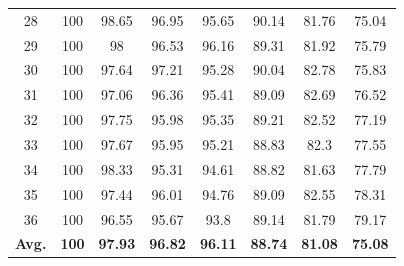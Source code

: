 \documentclass[review]{elsarticle}
\begin{document}
\begin{longtable}{c|ccccccc}
		28&100&98.65&96.95&95.65&90.14&81.76&75.04\\
		29&100&98&96.53&96.16&89.31&81.92&75.79\\
		30&100&97.64&97.21&95.28&90.04&82.78&75.83\\
		31&100&97.06&96.36&95.41&89.09&82.69&76.52\\
		32&100&97.75&95.98&95.35&89.21&82.52&77.19\\
		33&100&97.67&95.95&95.21&88.83&82.3&77.55\\
		34&100&98.33&95.31&94.61&88.82&81.63&77.79\\
		35&100&97.44&96.01&94.76&89.09&82.55&78.31\\
		36&100&96.55&95.67&93.8&89.14&81.79&79.17\\
		\hline
		\textbf{Avg.}&\textbf{100}&\textbf{97.93}&\textbf{96.82}&\textbf{96.11}&\textbf{88.74}&\textbf{81.08}&\textbf{75.08}\\
		\hline\hline	
\end{longtable}
\end{document}
